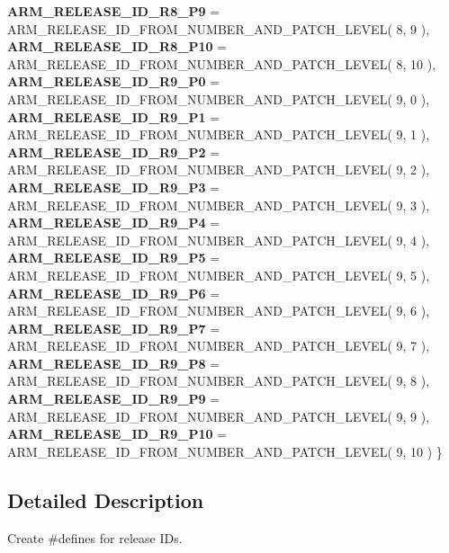 \begin{DoxyCompactItemize}
{\bfseries A\+R\+M\+\_\+\+R\+E\+L\+E\+A\+S\+E\+\_\+\+I\+D\+\_\+\+R8\+\_\+\+P9} = A\+R\+M\+\_\+\+R\+E\+L\+E\+A\+S\+E\+\_\+\+I\+D\+\_\+\+F\+R\+O\+M\+\_\+\+N\+U\+M\+B\+E\+R\+\_\+\+A\+N\+D\+\_\+\+P\+A\+T\+C\+H\+\_\+\+L\+E\+V\+EL( 8, 9 ), 
{\bfseries A\+R\+M\+\_\+\+R\+E\+L\+E\+A\+S\+E\+\_\+\+I\+D\+\_\+\+R8\+\_\+\+P10} = A\+R\+M\+\_\+\+R\+E\+L\+E\+A\+S\+E\+\_\+\+I\+D\+\_\+\+F\+R\+O\+M\+\_\+\+N\+U\+M\+B\+E\+R\+\_\+\+A\+N\+D\+\_\+\+P\+A\+T\+C\+H\+\_\+\+L\+E\+V\+EL( 8, 10 ), 
{\bfseries A\+R\+M\+\_\+\+R\+E\+L\+E\+A\+S\+E\+\_\+\+I\+D\+\_\+\+R9\+\_\+\+P0} = A\+R\+M\+\_\+\+R\+E\+L\+E\+A\+S\+E\+\_\+\+I\+D\+\_\+\+F\+R\+O\+M\+\_\+\+N\+U\+M\+B\+E\+R\+\_\+\+A\+N\+D\+\_\+\+P\+A\+T\+C\+H\+\_\+\+L\+E\+V\+EL( 9, 0 ), 
\newline
{\bfseries A\+R\+M\+\_\+\+R\+E\+L\+E\+A\+S\+E\+\_\+\+I\+D\+\_\+\+R9\+\_\+\+P1} = A\+R\+M\+\_\+\+R\+E\+L\+E\+A\+S\+E\+\_\+\+I\+D\+\_\+\+F\+R\+O\+M\+\_\+\+N\+U\+M\+B\+E\+R\+\_\+\+A\+N\+D\+\_\+\+P\+A\+T\+C\+H\+\_\+\+L\+E\+V\+EL( 9, 1 ), 
{\bfseries A\+R\+M\+\_\+\+R\+E\+L\+E\+A\+S\+E\+\_\+\+I\+D\+\_\+\+R9\+\_\+\+P2} = A\+R\+M\+\_\+\+R\+E\+L\+E\+A\+S\+E\+\_\+\+I\+D\+\_\+\+F\+R\+O\+M\+\_\+\+N\+U\+M\+B\+E\+R\+\_\+\+A\+N\+D\+\_\+\+P\+A\+T\+C\+H\+\_\+\+L\+E\+V\+EL( 9, 2 ), 
{\bfseries A\+R\+M\+\_\+\+R\+E\+L\+E\+A\+S\+E\+\_\+\+I\+D\+\_\+\+R9\+\_\+\+P3} = A\+R\+M\+\_\+\+R\+E\+L\+E\+A\+S\+E\+\_\+\+I\+D\+\_\+\+F\+R\+O\+M\+\_\+\+N\+U\+M\+B\+E\+R\+\_\+\+A\+N\+D\+\_\+\+P\+A\+T\+C\+H\+\_\+\+L\+E\+V\+EL( 9, 3 ), 
{\bfseries A\+R\+M\+\_\+\+R\+E\+L\+E\+A\+S\+E\+\_\+\+I\+D\+\_\+\+R9\+\_\+\+P4} = A\+R\+M\+\_\+\+R\+E\+L\+E\+A\+S\+E\+\_\+\+I\+D\+\_\+\+F\+R\+O\+M\+\_\+\+N\+U\+M\+B\+E\+R\+\_\+\+A\+N\+D\+\_\+\+P\+A\+T\+C\+H\+\_\+\+L\+E\+V\+EL( 9, 4 ), 
\newline
{\bfseries A\+R\+M\+\_\+\+R\+E\+L\+E\+A\+S\+E\+\_\+\+I\+D\+\_\+\+R9\+\_\+\+P5} = A\+R\+M\+\_\+\+R\+E\+L\+E\+A\+S\+E\+\_\+\+I\+D\+\_\+\+F\+R\+O\+M\+\_\+\+N\+U\+M\+B\+E\+R\+\_\+\+A\+N\+D\+\_\+\+P\+A\+T\+C\+H\+\_\+\+L\+E\+V\+EL( 9, 5 ), 
{\bfseries A\+R\+M\+\_\+\+R\+E\+L\+E\+A\+S\+E\+\_\+\+I\+D\+\_\+\+R9\+\_\+\+P6} = A\+R\+M\+\_\+\+R\+E\+L\+E\+A\+S\+E\+\_\+\+I\+D\+\_\+\+F\+R\+O\+M\+\_\+\+N\+U\+M\+B\+E\+R\+\_\+\+A\+N\+D\+\_\+\+P\+A\+T\+C\+H\+\_\+\+L\+E\+V\+EL( 9, 6 ), 
{\bfseries A\+R\+M\+\_\+\+R\+E\+L\+E\+A\+S\+E\+\_\+\+I\+D\+\_\+\+R9\+\_\+\+P7} = A\+R\+M\+\_\+\+R\+E\+L\+E\+A\+S\+E\+\_\+\+I\+D\+\_\+\+F\+R\+O\+M\+\_\+\+N\+U\+M\+B\+E\+R\+\_\+\+A\+N\+D\+\_\+\+P\+A\+T\+C\+H\+\_\+\+L\+E\+V\+EL( 9, 7 ), 
{\bfseries A\+R\+M\+\_\+\+R\+E\+L\+E\+A\+S\+E\+\_\+\+I\+D\+\_\+\+R9\+\_\+\+P8} = A\+R\+M\+\_\+\+R\+E\+L\+E\+A\+S\+E\+\_\+\+I\+D\+\_\+\+F\+R\+O\+M\+\_\+\+N\+U\+M\+B\+E\+R\+\_\+\+A\+N\+D\+\_\+\+P\+A\+T\+C\+H\+\_\+\+L\+E\+V\+EL( 9, 8 ), 
\newline
{\bfseries A\+R\+M\+\_\+\+R\+E\+L\+E\+A\+S\+E\+\_\+\+I\+D\+\_\+\+R9\+\_\+\+P9} = A\+R\+M\+\_\+\+R\+E\+L\+E\+A\+S\+E\+\_\+\+I\+D\+\_\+\+F\+R\+O\+M\+\_\+\+N\+U\+M\+B\+E\+R\+\_\+\+A\+N\+D\+\_\+\+P\+A\+T\+C\+H\+\_\+\+L\+E\+V\+EL( 9, 9 ), 
{\bfseries A\+R\+M\+\_\+\+R\+E\+L\+E\+A\+S\+E\+\_\+\+I\+D\+\_\+\+R9\+\_\+\+P10} = A\+R\+M\+\_\+\+R\+E\+L\+E\+A\+S\+E\+\_\+\+I\+D\+\_\+\+F\+R\+O\+M\+\_\+\+N\+U\+M\+B\+E\+R\+\_\+\+A\+N\+D\+\_\+\+P\+A\+T\+C\+H\+\_\+\+L\+E\+V\+EL( 9, 10 )
 \}
\end{DoxyCompactItemize}


\subsection{Detailed Description}
Create \#defines for release I\+Ds. 

